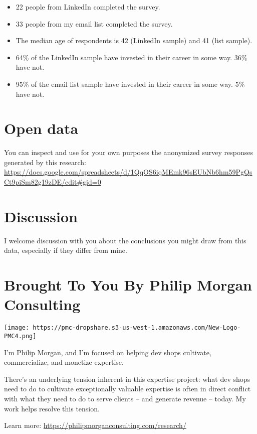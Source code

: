 \documentclass[13pt,]{tufte-handout}
\providecommand{\tightlist}{%
  \setlength{\itemsep}{0pt}\setlength{\parskip}{0pt}}
\begin{document}
\begin{itemize}
\tightlist
\item
  22 people from LinkedIn completed the survey.
\item
  33 people from my email list completed the survey.
\item
  The median age of respondents is 42 (LinkedIn sample) and 41 (list
  sample).
\item
  64\% of the LinkedIn sample have invested in their career in some way.
  36\% have not.
\item
  95\% of the email list sample have invested in their career in some
  way. 5\% have not.
\end{itemize}

\hypertarget{open-data}{%
\section{Open data}\label{open-data}}

You can inspect and use for your own purposes the anonymized survey
responses generated by this research:
\url{https://docs.google.com/spreadsheets/d/1QqOS6iqMEmk96sEUbNb6hm59PgQsCt9piSm82g19zDE/edit\#gid=0}

\hypertarget{discussion}{%
\section{Discussion}\label{discussion}}

I welcome discussion with you about the conclusions you might draw from
this data, especially if they differ from mine. 

\hypertarget{brought-to-you-by-philip-morgan-consulting}{%
\section{Brought To You By Philip Morgan
Consulting}\label{brought-to-you-by-philip-morgan-consulting}}

\texttt{[image: https://pmc-dropshare.s3-us-west-1.amazonaws.com/New-Logo-PMC4.png]}

I'm Philip Morgan, and I'm focused on helping dev shops cultivate,
commercialize, and monetize expertise.

There's an underlying tension inherent in this expertise project: what
dev shops need to do to cultivate exceptionally valuable expertise is
often in direct conflict with what they need to do to serve clients --
and generate revenue -- today. My work helps resolve this tension.

Learn more: \url{https://philipmorganconsulting.com/research/}
\end{document}
